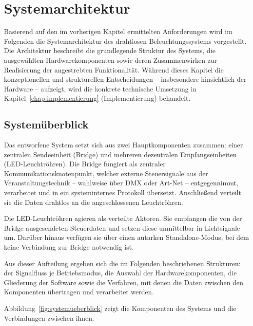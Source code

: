 \chapter{Systemarchitektur}
\label{chap:systemarchitektur}

Basierend auf den im vorherigen Kapitel ermittelten Anforderungen wird im Folgenden die 
Systemarchitektur des drahtlosen Beleuchtungssystems vorgestellt. 
Die Architektur beschreibt die grundlegende Struktur des Systems, die ausgewählten 
Hardwarekomponenten sowie deren Zusammenwirken zur Realisierung der angestrebten Funktionalität. 
Während dieses Kapitel die konzeptionellen und strukturellen Entscheidungen – insbesondere 
hinsichtlich der Hardware – aufzeigt, wird die konkrete technische Umsetzung 
in Kapitel~\ref{chap:implementierung} (Implementierung) behandelt.

\section{Systemüberblick}
\label{sec:systemueberblick}

Das entworfene System setzt sich aus zwei Hauptkomponenten zusammen: einer zentralen Sendeeinheit (Bridge) und 
mehreren dezentralen Empfangseinheiten (LED-Leuchtröhren). 
Die Bridge fungiert als zentraler Kommunikationsknotenpunkt, welcher externe Steuersignale 
aus der Veranstaltungstechnik – wahlweise über DMX oder Art-Net – entgegennimmt, verarbeitet und in 
ein systeminternes Protokoll übersetzt. 
Anschließend verteilt sie die Daten drahtlos an die angeschlossenen Leuchtröhren.

Die LED-Leuchtröhren agieren als verteilte Aktoren. 
Sie empfangen die von der Bridge ausgesendeten Steuerdaten und setzen diese unmittelbar in Lichtsignale um. 
Darüber hinaus verfügen sie über einen autarken Standalone-Modus, bei dem keine Verbindung zur Bridge notwendig ist. 

Aus dieser Aufteilung ergeben sich die im Folgenden beschriebenen Strukturen: der
Signalfluss je Betriebsmodus, die Auswahl der Hardwarekomponenten, die Gliederung der
Software sowie die Verfahren, mit denen die Daten zwischen den Komponenten übertragen
und verarbeitet werden.

Abbildung~\ref{fig:systemueberblick} zeigt die Komponenten des Systems und die
Verbindungen zwischen ihnen.


